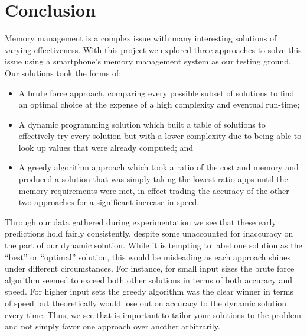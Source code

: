 \documentclass{article}
\begin{document}
\section{Conclusion}
Memory management is a complex issue with many interesting solutions of varying effectiveness. With this project we explored three approaches to solve this issue using a smartphone's memory management system as our testing ground. Our solutions took the forms of:
\begin{itemize}
    \item A brute force approach, comparing every possible subset of solutions to find an optimal choice at the expense of a high complexity and eventual run-time;
    \item A dynamic programming solution which built a table of solutions to effectively try every solution but with a lower complexity due to being able to look up values that were already computed; and
    \item A greedy algorithm approach which took a ratio of the cost and memory and produced a solution that was simply taking the lowest ratio apps until the memory requirements were met, in effect trading the accuracy of the other two approaches for a significant increase in speed.
\end{itemize}

Through our data gathered during experimentation we see that these early predictions hold fairly consistently, despite some unaccounted for inaccuracy on the part of our dynamic solution. While it is tempting to label one solution as the “best” or “optimal” solution, this would be misleading as each approach shines under different circumstances. For instance, for small input sizes the brute force algorithm seemed to exceed both other solutions in terms of both accuracy and speed. For higher input sets the greedy algorithm was the clear winner in terms of speed but theoretically would lose out on accuracy to the dynamic solution every time. Thus, we see that is important to tailor your solutions to the problem and not simply favor one approach over another arbitrarily.
\end{document}
